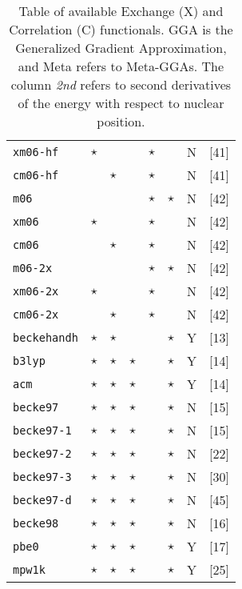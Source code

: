 \begin{table}[htp]
{\begin{tabular}{|l|p{0.12cm}p{0.12cm}cccp{0.35cm}|c|}
{\tt  xm06-hf  }& $\star$  &             &       &$\star$&       &  N   &[41]\\
{\tt  cm06-hf  }&          & $\star$     &       &$\star$&       &  N   &[41]\\
{\tt  m06      }&          &             &       &$\star$&$\star$&  N   &[42]\\
{\tt  xm06     }& $\star$  &             &       &$\star$&       &  N   &[42]\\
{\tt  cm06     }&          & $\star$     &       &$\star$&       &  N   &[42]\\
{\tt  m06-2x   }&          &             &       &$\star$&$\star$&  N   &[42]\\
{\tt  xm06-2x  }& $\star$  &             &       &$\star$&       &  N   &[42]\\
{\tt  cm06-2x  }&          & $\star$     &       &$\star$&       &  N   &[42]\\
\hline
{\tt  beckehandh}& $\star$  &   $\star$   &           &   & $\star$  &  Y   &[13]\\
{\tt  b3lyp    }& $\star$  &   $\star$   &  $\star$  &   & $\star$  &  Y   &[14]\\
{\tt  acm      }& $\star$  &   $\star$   &  $\star$  &   & $\star$  &  Y   &[14]\\
{\tt  becke97  }& $\star$  &   $\star$   &  $\star$  &   & $\star$  &  N   &[15]\\
{\tt  becke97-1}& $\star$  &   $\star$   &  $\star$  &   & $\star$  &  N   &[15]\\
{\tt  becke97-2}& $\star$  &   $\star$   &  $\star$  &   & $\star$  &  N   &[22]\\
{\tt  becke97-3}& $\star$  &   $\star$   &  $\star$  &   & $\star$  &  N   &[30]\\
{\tt  becke97-d}& $\star$  &   $\star$   &  $\star$  &   & $\star$  &  N   &[45]\\
{\tt  becke98  }& $\star$  &   $\star$   &  $\star$  &   & $\star$  &  N   &[16]\\
{\tt  pbe0     }& $\star$  &   $\star$   &  $\star$  &   & $\star$  &  Y   &[17]\\
{\tt  mpw1k    }& $\star$  &   $\star$   &  $\star$  &   & $\star$  &  Y   &[25]\\
\hline
\end{tabular}
\caption{Table of available Exchange (X) and Correlation (C) functionals.
GGA is the Generalized Gradient Approximation, and Meta refers to Meta-GGAs.
The column {\em 2nd} refers to second derivatives of the
energy with respect to nuclear position. }
\label{tablexc}
}
\end{table}




